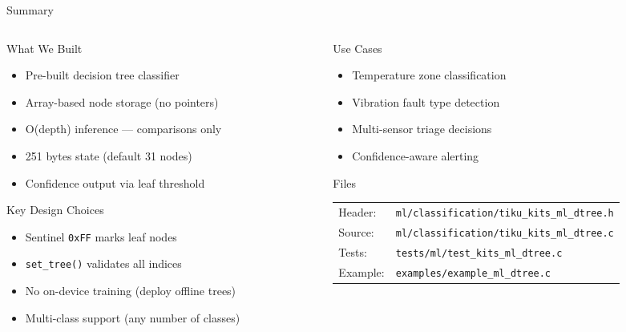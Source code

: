 \documentclass[aspectratio=169, 10pt]{beamer}
\begin{document}
\begin{frame}{Summary}
\begin{columns}[T]
\begin{column}{0.48\textwidth}
\begin{block}{What We Built}
\begin{itemize}
  \item Pre-built decision tree classifier
  \item Array-based node storage (no pointers)
  \item O(depth) inference --- comparisons only
  \item 251 bytes state (default 31 nodes)
  \item Confidence output via leaf threshold
\end{itemize}
\end{block}

\begin{block}{Key Design Choices}
\begin{itemize}
  \item Sentinel \texttt{0xFF} marks leaf nodes
  \item \texttt{set\_tree()} validates all indices
  \item No on-device training (deploy offline trees)
  \item Multi-class support (any number of classes)
\end{itemize}
\end{block}
\end{column}

\begin{column}{0.48\textwidth}
\begin{block}{Use Cases}
\begin{itemize}
  \item Temperature zone classification
  \item Vibration fault type detection
  \item Multi-sensor triage decisions
  \item Confidence-aware alerting
\end{itemize}
\end{block}

\begin{block}{Files}
\scriptsize
\begin{tabular}{@{}lp{4.5cm}@{}}
Header: & \texttt{ml/classification/tiku\_kits\_ml\_dtree.h} \\
Source: & \texttt{ml/classification/tiku\_kits\_ml\_dtree.c} \\
Tests: & \texttt{tests/ml/test\_kits\_ml\_dtree.c} \\
Example: & \texttt{examples/example\_ml\_dtree.c} \\
\end{tabular}
\end{block}
\end{column}
\end{columns}
\end{frame}
\end{document}

